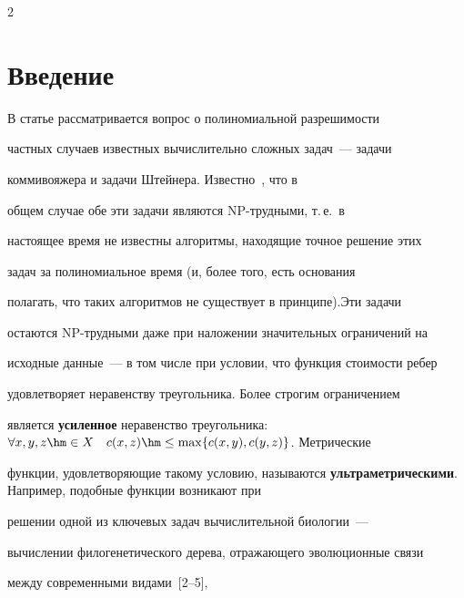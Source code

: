       \begin{multicols}{2}





            \label{st\stat}











\section{Введение}





В статье рассматривается вопрос о полиномиальной разрешимости


частных случаев известных вычислительно сложных задач~--- задачи


коммивояжера и задачи Штейнера. Известно~\cite{Gary_Johnson}, что в


общем случае обе эти задачи являются NP-труд\-ны\-ми, т.\,е.\ в


настоящее время не известны алгоритмы, находящие точное решение этих


задач за полиномиальное время (и, более того, есть основания


полагать, что таких алгоритмов не существует в принципе).\linebreak Эти задачи


остаются NP-трудными даже при наложении значительных ограничений на


исходные данные~--- в том числе при условии, что функция стои\-мости ребер


удовлетворяет неравенству треугольника. Более строгим ограничением


является \textbf{усиленное} неравенство треугольника: $ \forall x,y,z


\hm\in X \quad c(x,z) \hm\leq \max\{c(x,y), c(y,z)\} $. Метрические


функции, удовлетворяющие такому условию, называются \textbf{ульт\-ра\-мет\-ри\-че\-ски\-ми}. Например, подобные функции возникают при


решении одной из ключевых задач вычислительной биологии~---


вычислении филогенетического дерева, отража\-юще\-го эволюционные связи


между современными видами~[2--5],



\end{multicols}
